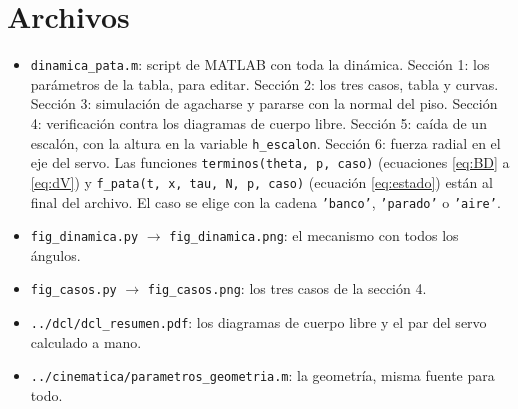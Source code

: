 \documentclass[11pt,a4paper]{article}
\begin{document}
\section{Archivos}

\begin{itemize}
\item \texttt{dinamica\_pata.m}: script de MATLAB con toda la dinámica. Sección 1: los parámetros de la tabla,
  para editar. Sección 2: los tres casos, tabla y curvas. Sección 3: simulación de agacharse y pararse con la
  normal del piso. Sección 4: verificación contra los diagramas de cuerpo libre. Sección 5: caída de un
  escalón, con la altura en la variable \texttt{h\_escalon}. Sección 6: fuerza radial en el eje del servo. Las funciones
  \texttt{terminos(theta, p, caso)} (ecuaciones \eqref{eq:BD} a \eqref{eq:dV}) y
  \texttt{f\_pata(t, x, tau, N, p, caso)} (ecuación \eqref{eq:estado}) están al final del archivo. El caso se
  elige con la cadena \texttt{'banco'}, \texttt{'parado'} o \texttt{'aire'}.
\item \texttt{fig\_dinamica.py} \(\to\) \texttt{fig\_dinamica.png}: el mecanismo con todos los ángulos.
\item \texttt{fig\_casos.py} \(\to\) \texttt{fig\_casos.png}: los tres casos de la sección 4.
\item \texttt{../dcl/dcl\_resumen.pdf}: los diagramas de cuerpo libre y el par del servo calculado a mano.
\item \texttt{../cinematica/parametros\_geometria.m}: la geometría, misma fuente para todo.
\end{itemize}
\end{document}
